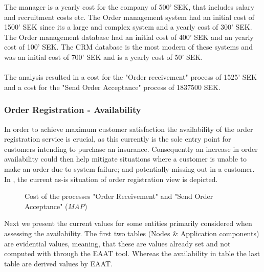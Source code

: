 The manager is a yearly cost for the company of 500' SEK, that includes salary and recruitment costs etc. The Order management system had an initial cost of 1500' SEK since its a large and complex system and a yearly cost of 300' SEK. The Order management database had an initial cost of 400' SEK and an yearly cost of 100' SEK. The CRM database is the most modern of these systems and was an initial cost of 700' SEK and is a yearly cost of 50' SEK.\\\\
%
The analysis resulted in a cost for the "Order receivement" process of 1525' SEK and a cost for the "Send Order Acceptance" process of 1837500 SEK.
%
\subsubsection{Order Registration - Availability}
\label{sec:order_availability}
In order to achieve maximum customer satisfaction the availability of the order registration service is crucial, as this currently is the sole entry point for customers intending to purchase an insurance. Consequently an increase in order availability could then help mitigate situations where a customer is unable to make an order due to system failure; and potentially missing out in a customer. In , the current as-is situation of order registration view is depicted.
\begin{center}
	\begin{figure}[H]
		\centering
		\setlength\fboxsep{7pt}
		\setlength\fboxrule{0.5pt}
		\caption{Cost of the processes "Order Receivement" and "Send Order Acceptance" (\emph{MAP})}
		\label{fig:map_order_availability}
	\end{figure}
\end{center}
Next we present the current values for some entities primarily considered when assessing the availability. The first two tables (Nodes \& Application components) are evidential values, meaning, that these are values already set and not computed with through the EAAT tool. Whereas the availability in table the last table are derived values by EAAT.
%
